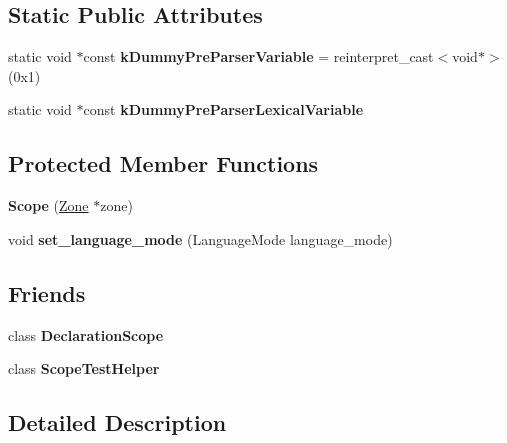 \subsection*{Static Public Attributes}
\begin{DoxyCompactItemize}
\item 
\mbox{\label{classv8_1_1internal_1_1Scope_a16e35c1a7acd4166a58c99b578de38b4}} 
static void $\ast$const {\bfseries k\+Dummy\+Pre\+Parser\+Variable} = reinterpret\+\_\+cast$<$void$\ast$$>$(0x1)
\item 
static void $\ast$const {\bfseries k\+Dummy\+Pre\+Parser\+Lexical\+Variable}
\end{DoxyCompactItemize}
\subsection*{Protected Member Functions}
\begin{DoxyCompactItemize}
\item 
\mbox{\label{classv8_1_1internal_1_1Scope_a706709fab8e137ffde24fd375516c7a2}} 
{\bfseries Scope} (\mbox{\hyperlink{classv8_1_1internal_1_1Zone}{Zone}} $\ast$zone)
\item 
\mbox{\label{classv8_1_1internal_1_1Scope_a0b7f8778802e8da8b5240db37e67e9a7}} 
void {\bfseries set\+\_\+language\+\_\+mode} (Language\+Mode language\+\_\+mode)
\end{DoxyCompactItemize}
\subsection*{Friends}
\begin{DoxyCompactItemize}
\item 
\mbox{\label{classv8_1_1internal_1_1Scope_a54e6d2c904a903cb733f956ccca97cbf}} 
class {\bfseries Declaration\+Scope}
\item 
\mbox{\label{classv8_1_1internal_1_1Scope_aca1f490b9174b7db6eb39663a41d3f98}} 
class {\bfseries Scope\+Test\+Helper}
\end{DoxyCompactItemize}


\subsection{Detailed Description}


